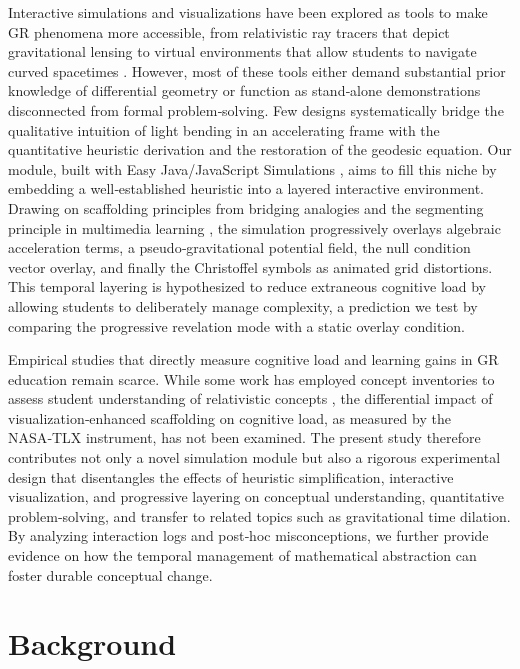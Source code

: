 \documentclass{article}
\begin{document}
Interactive simulations and visualizations have been explored as tools to make GR phenomena more accessible, from relativistic ray tracers that depict gravitational lensing \cite{weiskopf_gr_vis_2004} to virtual environments that allow students to navigate curved spacetimes \cite{koerber_simulation_2019}. However, most of these tools either demand substantial prior knowledge of differential geometry or function as stand‑alone demonstrations disconnected from formal problem‑solving. Few designs systematically bridge the qualitative intuition of light bending in an accelerating frame with the quantitative heuristic derivation and the restoration of the geodesic equation. Our module, built with Easy Java/JavaScript Simulations \cite{esquembre_ejs_2004}, aims to fill this niche by embedding a well‑established heuristic into a layered interactive environment. Drawing on scaffolding principles from bridging analogies \cite{clement_bridging_1993} and the segmenting principle in multimedia learning \cite{mayer_multimedia_2021}, the simulation progressively overlays algebraic acceleration terms, a pseudo‑gravitational potential field, the null condition vector overlay, and finally the Christoffel symbols as animated grid distortions. This temporal layering is hypothesized to reduce extraneous cognitive load by allowing students to deliberately manage complexity, a prediction we test by comparing the progressive revelation mode with a static overlay condition.

Empirical studies that directly measure cognitive load and learning gains in GR education remain scarce. While some work has employed concept inventories to assess student understanding of relativistic concepts \cite{baily_empirical_2015}, the differential impact of visualization‑enhanced scaffolding on cognitive load, as measured by the NASA‑TLX instrument, has not been examined. The present study therefore contributes not only a novel simulation module but also a rigorous experimental design that disentangles the effects of heuristic simplification, interactive visualization, and progressive layering on conceptual understanding, quantitative problem‑solving, and transfer to related topics such as gravitational time dilation. By analyzing interaction logs and post‑hoc misconceptions, we further provide evidence on how the temporal management of mathematical abstraction can foster durable conceptual change.

\section{Background}
\end{document}
